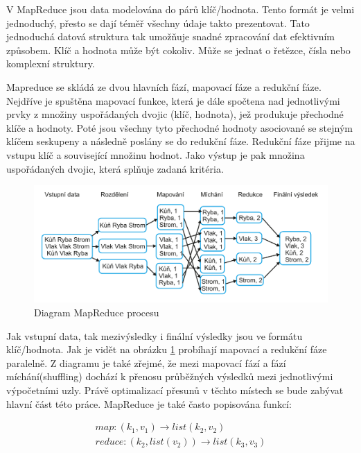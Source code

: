 \documentclass[thesis=M,czech]{FITthesis}[2012/06/26]
\begin{document}
V MapReduce jsou data modelována do párů klíč/hodnota. Tento formát je velmi jednoduchý, přesto se dají téměř všechny údaje takto prezentovat. Tato jednoduchá datová struktura tak umožňuje snadné zpracování dat efektivním způsobem. Klíč a hodnota může být cokoliv. Může se jednat o řetězce, čísla nebo komplexní struktury.

Mapreduce se skládá ze dvou hlavních fází, mapovací fáze a redukční fáze. Nejdříve je spuštěna mapovací funkce, která je dále spočtena nad jednotlivými prvky z množiny uspořádaných dvojic (klíč, hodnota), jež produkuje přechodné klíče a hodnoty.\cite{HadoopDG}
Poté jsou všechny tyto přechodné hodnoty asociované se stejným klíčem seskupeny a následně poslány se do redukční fáze. Redukční fáze přijme na vstupu klíč a související množinu hodnot. Jako výstup je pak množina uspořádaných dvojic, která splňuje zadaná kritéria.
\begin{figure}[h]\centering
	\includegraphics[width=1\textwidth, angle=0]			{files/MapReduce}
	\caption[Diagram MapReduce procesu]{Diagram MapReduce procesu}\label{fig:mapred}
\end{figure} 

Jak vstupní data, tak mezivýsledky i finální výsledky jsou ve formátu klíč/hodnota. Jak je vidět na obrázku \ref{fig:mapred} probíhají mapovací a redukční fáze paralelně. Z diagramu je také zřejmé, že mezi mapovací fází a fází míchání(shuffling) dochází k přenosu průběžných výsledků mezi jednotlivými výpočetními uzly. Právě optimalizací přesunů v těchto místech se bude zabývat hlavní část této práce. 
MapReduce je také často popisována funkcí: 

\begin{eqnarray}
	map: (k_1, v_1) \rightarrow  list(k_2, v_2) \nonumber \\
	reduce: (k_2, list(v_2)) \rightarrow list(k_3, v_3) \nonumber 
\end{eqnarray}
\end{document}

